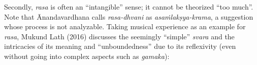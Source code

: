 \newpage

Secondly, \textsl{rasa} is often an “intangible” sense; it cannot be theorized “too much”. Note that Ānandavardhana calls \textsl{rasa-dhvani}
 as \textsl{asaṁlakṣya-krama}, a suggestion whose process is not analyzable. Taking musical experience as an example for \textsl{rasa}, Mukund Lath (2016) discusses the seemingly “simple” \textsl{svara} and the intricacies of its meaning and “unboundedness” due to its reflexivity (even without going into complex aspects such as \textsl{gamaka}):

